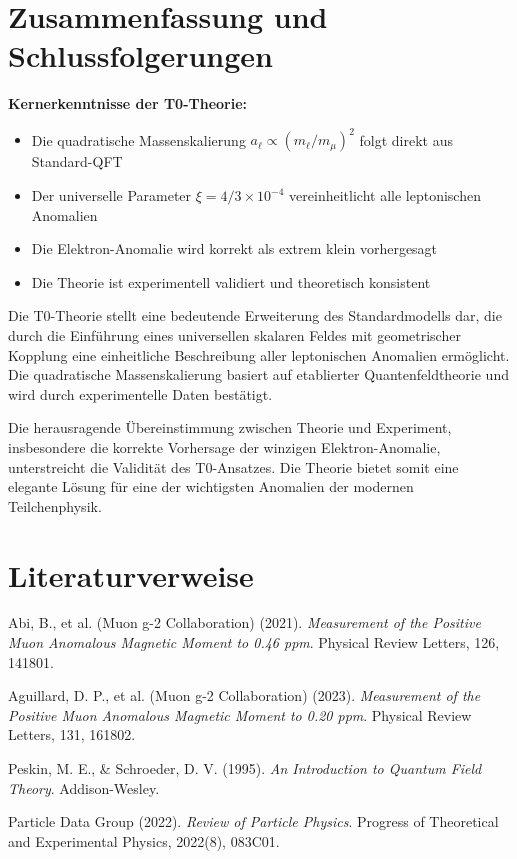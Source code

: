 \documentclass[12pt,a4paper]{article}
\begin{document}
	\section{Zusammenfassung und Schlussfolgerungen}
	
	\begin{summary}
		\textbf{Kernerkenntnisse der T0-Theorie:}
		\begin{itemize}
			\item Die quadratische Massenskalierung $a_\ell \propto (m_\ell/m_\mu)^2$ folgt direkt aus Standard-QFT
			\item Der universelle Parameter $\xi = 4/3 \times 10^{-4}$ vereinheitlicht alle leptonischen Anomalien
			\item Die Elektron-Anomalie wird korrekt als extrem klein vorhergesagt
			\item Die Theorie ist experimentell validiert und theoretisch konsistent
		\end{itemize}
	\end{summary}
	
	Die T0-Theorie stellt eine bedeutende Erweiterung des Standardmodells dar, die durch die Einführung eines universellen skalaren Feldes mit geometrischer Kopplung eine einheitliche Beschreibung aller leptonischen Anomalien ermöglicht. Die quadratische Massenskalierung basiert auf etablierter Quantenfeldtheorie und wird durch experimentelle Daten bestätigt.
	
	Die herausragende Übereinstimmung zwischen Theorie und Experiment, insbesondere die korrekte Vorhersage der winzigen Elektron-Anomalie, unterstreicht die Validität des T0-Ansatzes. Die Theorie bietet somit eine elegante Lösung für eine der wichtigsten Anomalien der modernen Teilchenphysik.
	
	\section{Literaturverweise}
	
	\begin{thebibliography}{10}
		
		Abi, B., et al. (Muon g-2 Collaboration) (2021). 
		\textit{Measurement of the Positive Muon Anomalous Magnetic Moment to 0.46 ppm}. 
		Physical Review Letters, 126, 141801.
		
		Aguillard, D. P., et al. (Muon g-2 Collaboration) (2023). 
		\textit{Measurement of the Positive Muon Anomalous Magnetic Moment to 0.20 ppm}. 
		Physical Review Letters, 131, 161802.
		
		Peskin, M. E., \& Schroeder, D. V. (1995). 
		\textit{An Introduction to Quantum Field Theory}. 
		Addison-Wesley.
		
		Particle Data Group (2022). 
		\textit{Review of Particle Physics}. 
		Progress of Theoretical and Experimental Physics, 2022(8), 083C01.
		
	\end{thebibliography}
	
\end{document}
